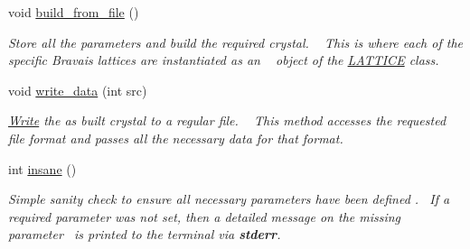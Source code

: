 \begin{DoxyCompactItemize}
$$void \hyperlink{class_i_n_t_e_r_f_a_c_e_a5f9daf84cbf9f286eadf64734c7a73d4}{build\+\_\+from\+\_\+file} ()
\begin{DoxyCompactList}\small\item\em Store all the parameters and build the required crystal. ~\newline
This is where each of the specific Bravais lattices are instantiated as an ~\newline
object of the \hyperlink{class_l_a_t_t_i_c_e}{L\+A\+T\+T\+I\+C\+E} class. \end{DoxyCompactList}\item 
void \hyperlink{class_i_n_t_e_r_f_a_c_e_ae00f42c78b8ad7323745e9b0cea1971c}{write\+\_\+data} (int src)
\begin{DoxyCompactList}\small\item\em \hyperlink{class_write}{Write} the as built crystal to a regular file. ~\newline
This method accesses the requested file format and passes all the necessary data for that format. \end{DoxyCompactList}\item 
int \hyperlink{class_i_n_t_e_r_f_a_c_e_a5811f0eaaa397ae3b72453774e424b67}{insane} ()
\begin{DoxyCompactList}\small\item\em Simple sanity check to ensure all necessary parameters have been defined .~\newline
 If a required parameter was not set, then a detailed message on the missing parameter~\newline
 is printed to the terminal via {\bfseries {\ttfamily stderr}}. \end{DoxyCompactList}\end{DoxyCompactItemize}
